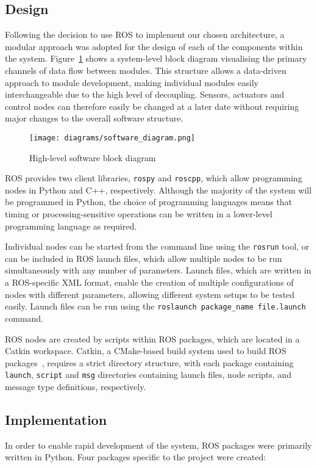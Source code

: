 \subsection{Design}\label{soft/ROS/design}
Following the decision to use ROS to implement our chosen architecture, a modular
approach was adopted for the design of each of the components within the system.
Figure~\ref{fig:software_block_diagram} shows a system-level block diagram visualising the
primary channels of data flow between modules. This structure allows a
data-driven approach to module development, making individual modules easily
interchangeable due to the high level of decoupling. Sensors, actuators and
control nodes can therefore easily be changed at a later date without requiring
major changes to the overall software structure.

\begin{figure}[!ht]
	\centering
	\texttt{[image: diagrams/software\_diagram.png]}
	\caption{High-level software block diagram}\label{fig:software_block_diagram}
\end{figure}

ROS provides two client libraries, \verb|rospy| and \verb|roscpp|, which allow
programming nodes in Python and C++, respectively. Although the majority of
the system will be programmed in Python, the choice of programming languages
means that timing or processing-sensitive operations can be written in a
lower-level programming language as required.

Individual nodes can be started from the command line using the \verb|rosrun|
tool, or can be included in ROS launch files, which allow multiple nodes to
be run simultaneously with any number of parameters. Launch files, which are
written in a ROS-specific XML format, enable the
creation of multiple configurations of nodes with different parameters,
allowing different system setups to be tested easily. Launch files can be run
using the \verb|roslaunch package_name file.launch| command.

ROS nodes are created by scripts within ROS packages, which are located in a
Catkin workspace. Catkin, a CMake-based build system used to build ROS
packages~\cite{gitcatkin}, requires a strict directory structure, with each
package containing \verb|launch|, \verb|script| and \verb|msg| directories
containing launch files, node scripts, and message type definitions,
respectively.

\subsection{Implementation}\label{soft/ROS/impl}
In order to enable rapid development of the system, ROS packages were
primarily written in Python. Four packages specific to the project were
created:

